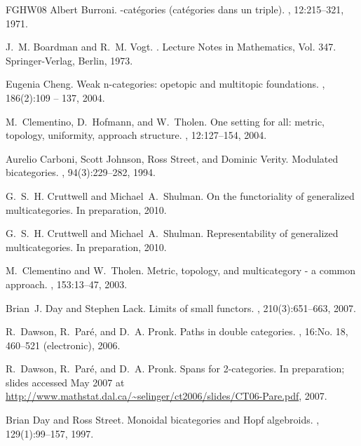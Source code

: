 \documentclass{tac}
\numberwithin{equation}{section}
\begin{document}
\begin{thebibliography}{FGHW08}
Albert Burroni.
-cat\'egories (cat\'egories dans un triple).
, 12:215--321, 1971.

J.~M. Boardman and R.~M. Vogt.
.
\newblock Lecture Notes in Mathematics, Vol. 347. Springer-Verlag, Berlin,
  1973.

Eugenia Cheng.
\newblock Weak n-categories: opetopic and multitopic foundations.
, 186(2):109 -- 137, 2004.

M.~Clementino, D.~Hofmann, and W.~Tholen.
\newblock One setting for all: metric, topology, uniformity, approach
  structure.
, 12:127--154, 2004.

Aurelio Carboni, Scott Johnson, Ross Street, and Dominic Verity.
\newblock Modulated bicategories.
, 94(3):229--282, 1994.

G.~S.~H. Cruttwell and Michael~A.\ Shulman.
\newblock On the functoriality of generalized multicategories.
\newblock In preparation, 2010.

G.~S.~H. Cruttwell and Michael~A.\ Shulman.
\newblock Representability of generalized multicategories.
\newblock In preparation, 2010.

M.~Clementino and W.~Tholen.
\newblock Metric, topology, and multicategory - a common approach.
, 153:13--47, 2003.

Brian~J. Day and Stephen Lack.
\newblock Limits of small functors.
, 210(3):651--663, 2007.

R.~Dawson, R.~Par{\'e}, and D.~A. Pronk.
\newblock Paths in double categories.
, 16:No. 18, 460--521 (electronic), 2006.

R.~Dawson, R.~Par{\'e}, and D.~A. Pronk.
\newblock Spans for 2-categories.
\newblock In preparation; slides accessed May 2007 at
  \url{http://www.mathstat.dal.ca/~selinger/ct2006/slides/CT06-Pare.pdf}, 2007.

Brian Day and Ross Street.
\newblock Monoidal bicategories and {H}opf algebroids.
, 129(1):99--157, 1997.


\end{thebibliography}
\end{document}
